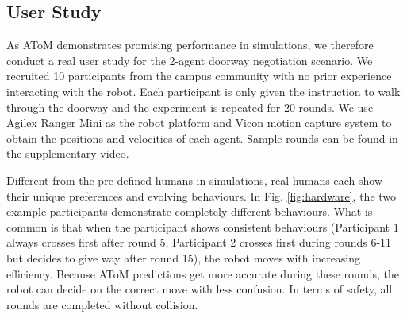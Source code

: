 \subsection{User Study}
As AToM demonstrates promising performance in simulations, we therefore conduct a real user study for the 2-agent doorway negotiation scenario. 
We recruited 10 participants from the campus community with no prior experience interacting with the robot. Each participant is only given the instruction to walk through the doorway and the experiment is repeated for 20 rounds.
We use Agilex Ranger Mini as the robot platform and Vicon motion capture system to obtain the positions and velocities of each agent.
Sample rounds can be found in the supplementary video.

Different from the pre-defined humans in simulations, real humans each show their unique preferences and evolving behaviours. 
In Fig. \ref{fig:hardware}, the two example participants demonstrate completely different behaviours. What is common is that when the participant shows consistent behaviours (Participant 1 always crosses first after round 5, Participant 2 crosses first during rounds 6-11 but decides to give way after round 15), the robot moves with increasing efficiency. Because AToM predictions get more accurate during these rounds, the robot can decide on the correct move with less confusion. In terms of safety, all rounds are completed without collision.